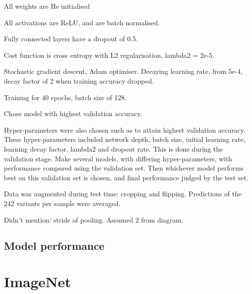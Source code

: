All weights are He initialised 

All activations are ReLU, and are batch normalised.

Fully connected layers have a dropout of 0.5.

Cost function is cross entropy with L2 regularisation, lambda2 = 2e-5. 

Stochastic gradient descent, Adam optimiser. Decaying learning rate, from 5e-4, decay factor of 2 when training accuracy dropped. 

Training for 40 epochs, batch size of 128.

Chose model with highest validation accuracy. 

Hyper-parameters were also chosen such as to attain highest validation accuracy. These hyper-parameters included network depth, batch size, initial learning rate, learning decay factor, lambda2 and dropout rate. This is done during the validation stage. Make several models, with differing hyper-parameters, with performance compared using the validation set. Then whichever model performs best on this validation set is chosen, and final performance judged by the test set.

Data was augmented during test time: cropping and flipping. Predictions of the 242 variants per sample were averaged.

Didn't mention: stride of pooling. Assumed 2 from diagram.
 
\subsection{Model performance}
 
\section{ImageNet}



%